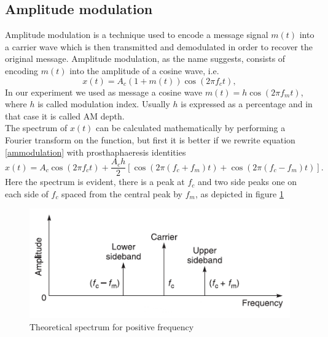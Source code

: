 \documentclass[a4paper,10pt]{article}
\begin{document}
\subsection{Amplitude modulation}
Amplitude modulation is a technique used to encode a message signal $m(t)$ into a carrier wave which is then transmitted and demodulated in order to recover the original message. Amplitude modulation, as the name suggests, consists of encoding $m(t)$ into the amplitude of a cosine wave, i.e.
\begin{equation}\label{ammodulation}x(t) = A_c (1+ m(t))\cos(2\pi f_c t),\end{equation}
In our experiment we used as message a cosine wave $m(t) = h\cos(2\pi f_m t)$, where $h$ is called modulation index. Usually $h$ is expressed as a percentage and in that case it is called AM depth.\\
The spectrum of $x(t)$ can be calculated mathematically by performing a Fourier transform on the function, but first it is better if we rewrite equation \eqref{ammodulation} with prosthaphaeresis identities
\begin{equation}x(t) = A_c \cos(2\pi f_c t) + \frac{A_ch}{2}\left[\cos(2\pi(f_c + f_m)t)+\cos(2\pi(f_c - f_m)t)\right].\end{equation}
Here the spectrum is evident, there is a peak at $f_c$ and two side peaks one on each side of $f_c$ spaced from the central peak by $f_m$, as depicted in figure \ref{amtheory}
\begin{figure}[H]
\centering
\includegraphics[width=.7\textwidth]{amtheory}
\caption{Theoretical spectrum for positive frequency}\label{amtheory}
\end{figure}
\end{document}
